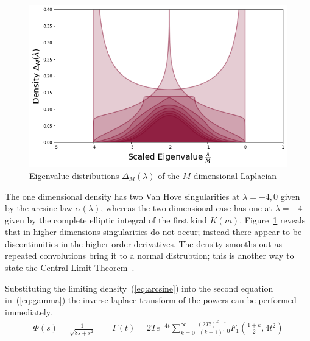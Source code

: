 \documentclass{article}[12pt]
\numberwithin{equation}{section}
\begin{document}
\begin{figure}[H]
\centering{}
\captionsetup{justification=centering}
\includegraphics[scale=0.45]{figures/density}
\caption{Eigenvalue distributions $\Delta_M(\lambda)$ of the $M$-dimensional Laplacian}
\label{fig:dos}
\end{figure}
The one dimensional density has two Van Hove singularities at $\lambda=-4,0$
given by the arcsine law $\alpha(\lambda)$, whereas the two dimensional
case has one at $\lambda=-4$ given by the complete elliptic integral
of the first kind $K(m)$. Figure~\ref{fig:dos} reveals that in higher
dimensions singularities do not occur; instead there appear to be
discontinuities in the higher order derivatives. The density smooths out
as repeated convolutions bring it to a normal distrubtion; this is another
way to state the Central Limit Theorem~\cite{}.

Substituting the limiting density~(\ref{eq:arcsine}) into the second equation
in~(\ref{eq:gamma}) the inverse laplace transform of the powers can be
performed immediately.
\begin{align}
  \Phi(s)=\frac{1}{\sqrt{8s + s^2}}
  \qquad
  \Gamma(t)=2Te^{-4t}
  \sum_{k=0}^{\infty}\frac{(2Tt)^{k-1}}{(k-1)!}
  {}_0F_1(\frac{1+k}{2},4t^2)
\end{align}
\end{document}
